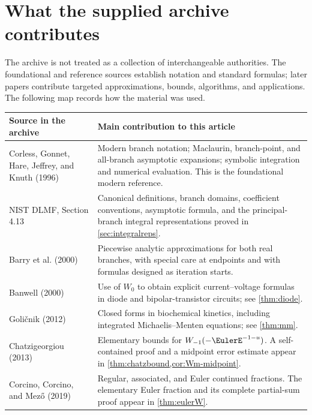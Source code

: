\documentclass[11pt]{article}
\theoremstyle{remark}
\begin{document}
\section{What the supplied archive contributes}\label{sec:archive}

The archive is not treated as a collection of interchangeable authorities.
The foundational and reference sources establish notation and standard
formulas; later papers contribute targeted approximations, bounds,
algorithms, and applications.  The following map records how the material
was used.

\begin{longtable}{@{}>{\raggedright\arraybackslash}p{}>{\raggedright\arraybackslash}p{}@{}}
\toprule
Source in the archive & Main contribution to this article\\
\midrule
\endhead
Corless, Gonnet, Hare, Jeffrey, and Knuth (1996)~\cite{corless1996} &
Modern branch notation; Maclaurin, branch-point, and all-branch asymptotic
expansions; symbolic integration and numerical evaluation.  This is the
foundational modern reference.\\
\addlinespace
NIST DLMF, Section 4.13~\cite{dlmf} &
Canonical definitions, branch domains, coefficient conventions, asymptotic
formula, and the principal-branch integral representations proved in
\cref{sec:integralreps}.\\
\addlinespace
Barry et al. (2000)~\cite{barry2000} &
Piecewise analytic approximations for both real branches, with special care
at endpoints and with formulas designed as iteration starts.\\
\addlinespace
Banwell (2000)~\cite{banwell2000} &
Use of \(W_0\) to obtain explicit current--voltage formulas in diode and
bipolar-transistor circuits; see \cref{thm:diode}.\\
\addlinespace
Goli\v{c}nik (2012)~\cite{golicnik2012} &
Closed forms in biochemical kinetics, including integrated
Michaelis--Menten equations; see \cref{thm:mm}.\\
\addlinespace
Chatzigeorgiou (2013)~\cite{chatzigeorgiou2013} &
Elementary bounds for \(W_{-1}(-\EulerE^{-1-u})\).  A self-contained proof and
a midpoint error estimate appear in
\cref{thm:chatzbound,cor:Wm-midpoint}.\\
\addlinespace
Corcino, Corcino, and Mez\H{o} (2019)~\cite{corcino2019} &
Regular, associated, and Euler continued fractions.  The elementary Euler
fraction and its complete partial-sum proof appear in
\cref{thm:eulerW}.\\

\end{longtable}
\end{document}
